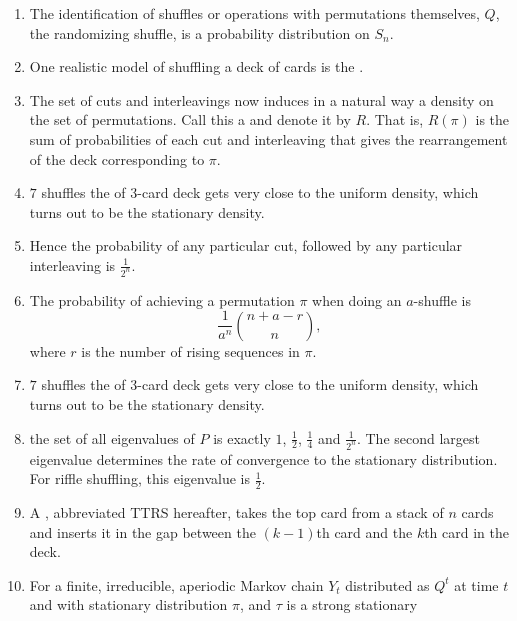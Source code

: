 \documentclass[12pt]{article}
\begin{document}
\begin{enumerate}
    \item
        The identification of shuffles or operations with permutations
        themselves, \( Q \), the randomizing shuffle, is a probability
        distribution on \( S_n \).
    \item
        One realistic model of shuffling a deck of cards is the .
    \item
        The set of cuts and interleavings now induces in a natural way a
        density on the set of permutations.  Call this a  and denote it by \( R \).  That is, \( R(\pi) \) is the
        sum of probabilities of each cut and interleaving that gives the
        rearrangement of the deck corresponding to \( \pi \).
    \item
        \( 7 \) shuffles the of 3-card deck gets very close to the
        uniform density, which turns out to be the stationary density.
    \item
        Hence the probability of any particular cut, followed by any
        particular interleaving is \( \frac{1}{2^n} \).
    \item
        The probability of achieving a permutation \( \pi \) when doing
        an \( a \)-shuffle is
        \[
            \frac{1}{a^n} \binom{n + a - r}{n},
        \] where \( r \) is the number of rising sequences in \( \pi \).
    \item
        \( 7 \) shuffles the of 3-card deck gets very close to the
        uniform density, which turns out to be the stationary density.
    \item
        the set of all eigenvalues of \( P \) is exactly \( 1 \), \(
        \frac{1}{2} \), \( \frac{1}{4} \) and \( \frac{1}{2^n} \).  The
        second largest eigenvalue determines the rate of convergence to
        the stationary distribution. For riffle shuffling, this
        eigenvalue is \( \frac{1}{2} \).
    \item
        A ,%
        abbreviated TTRS hereafter, takes the top card from a stack of \(
        n \) cards and inserts it in the gap between the \( (k-1) \)th
        card and the \( k \)th card in the deck.
    \item
        For a finite, irreducible, aperiodic Markov chain \( Y_t \)
        distributed as \( Q^t \) at time \( t \) and with stationary
        distribution \( \pi \), and \( \tau \) is a strong stationary

\end{enumerate}
\end{document}
